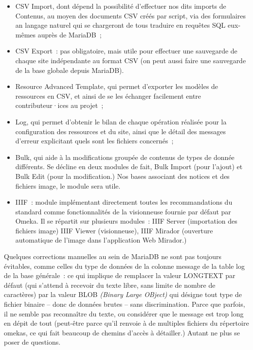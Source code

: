 \documentclass[a4paper,12pt, twoside]{book}
\begin{document}
\begin{itemize}
    \item \textsf{CSV Import}, dont dépend la possibilité d’effectuer nos dits imports de Contenus, au moyen des documents CSV créés par script, via des formulaires an langage naturel qui se chargeront de tous traduire en requêtes SQL eux-mêmes auprès de MariaDB~;\\

    \item \textsf{CSV Export}~: pas obligatoire, mais utile pour effectuer une sauvegarde de chaque site indépendante au format CSV (on peut aussi faire une sauvegarde de la base globale depuis MariaDB).\\

    \item \textsf{Resource Advanced Template}, qui permet d’exporter les modèles de ressources en CSV, et ainsi de se les échanger facilement entre contributeur·ices au projet~;\\

    \item \textsf{Log}, qui permet d’obtenir le bilan de chaque opération réalisée pour la configuration des ressources et du site, ainsi que le détail des messages d’erreur explicitant quels sont les fichiers concernés~;\\

    \item \textsf{Bulk}, qui aide à la modifications groupée de contenus de types de donnée différents. Se décline en deux modules de fait, \textsf{Bulk Import} (pour l’ajout) et \textsf{Bulk Edit} (pour la modification.) Nos bases associant des notices et des fichiers image, le module sera utile.\\

    \item IIIF~: module implémentant directement toutes les recommandations du standard comme fonctionnalités de la visionneuse fournie par défaut par Omeka. Il se répartit sur plusieurs modules~: \textsf{IIIF Server} (importation des fichiers image) \textsf{IIIF Viewer} (visionneuse), \textsf{IIIF Mirador} (ouverture automatique de l’image dans l’application Web Mirador.)
\end{itemize}

Quelques corrections manuelles au sein de MariaDB ne sont pas toujours évitables, comme celles du type de données de la colonne \textsf{message} de la table \textsf{log} de la base générale~: ce qui implique de remplacer la valeur \textsf{LONGTEXT} par défaut (qui s’attend à recevoir du texte libre, sans limite de nombre de caractères) par la valeur \textsf{BLOB} \emph{(Binary Large OBject)} qui désigne tout type de fichier binaire – donc de données brutes – sans discrimination. Parce que parfois, il ne semble pas reconnaître du texte, ou considérer que le message est trop long en dépit de tout (peut-être parce qu’il renvoie à de multiples fichiers du répertoire \textsf{omekas}, ce qui fait beaucoup de chemins d’accès à détailler.) Autant ne plus se poser de questions.
\end{document}
